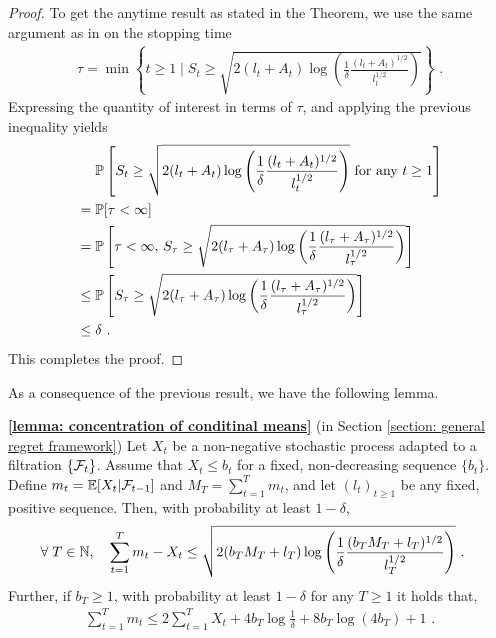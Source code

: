 \begin{proof}
	To get the anytime result as stated in the Theorem, we use the same argument as in \citep{Abbasi-YadkoriImprovedAlgorithmsLinear2011} on the stopping time
	\begin{align*}
	\tau = \min\left\{t \geq 1 \;|\; S_t \geq \sqrt{2 (l_t + A_t) \log\left(\frac{1}{\delta}\frac{(l_t + A_t)^{1/2}}{l_t^{1/2}}\right)} \right\} \text{ .}
	\end{align*}
	Expressing the quantity of interest in terms of $\tau$, and applying the previous inequality yields
	\begin{align*}
	&\+ \PP\left[ S_t \geq \sqrt{2 (l_t + A_t) \log\left(\frac{1}{\delta}\frac{(l_t + A_t)^{1/2}}{l_t^{1/2}}\right)} \text{ for any } t \geq 1\right] \\
	&=	\PP[\tau < \infty] \\
	&= \PP\left[\tau < \infty,\, S_\tau \geq \sqrt{2 (l_\tau + A_\tau) \log\left(\frac{1}{\delta}\frac{(l_\tau + A_\tau)^{1/2}}{l_\tau^{1/2}}\right)}\right] \\
	&\leq \PP\left[S_\tau \geq \sqrt{2 (l_\tau + A_\tau) \log\left(\frac{1}{\delta}\frac{(l_\tau + A_\tau)^{1/2}}{l_\tau^{1/2}}\right)} \right]\\
	&\leq \delta \text{ .}
	\end{align*}
	This completes the proof.
\end{proof}
\noindent
As a consequence of the previous result, we have the following lemma.
\begin{lemma*}{\textbf{\ref{lemma: concentration of conditinal means}}} {(in Section \ref{section: general regret framework})} 
	Let $X_t$ be a non-negative stochastic process adapted to a filtration $\{\mathcal{F}_t \}$. Assume that $X_t \leq b_t$ for a fixed, non-decreasing sequence $\{b_t\}$. Define $m_t = \mathbb{E}[X_t|\mathcal{F}_{t-1}]$ and $M_T = \sum_{t=1}^T m_t$, and let $(l_t)_{t\geq 1}$ be any fixed, positive sequence. Then, with probability at least $1-\delta$,
	\begin{align*}
	\forall \; T\in \mathbb{N}, \quad \sum_{t=1}^T m_t - X_t &\leq \sqrt{2(b_T M_T + l_T) \log\left(\frac{1}{\delta} \frac{(b_T M_T + l_T)^{1/2}}{l_T^{1/2}}\right)} \text{ .}
	\end{align*}
	Further, if $b_T \geq 1$, with probability at least $1-\delta$ for any $T \geq 1$ it holds that,
	\begin{align*}
	\sum_{t=1}^T m_t \leq 2\sum_{t=1}^T X_t + 4 b_T \log\frac{1}{\delta} + 8  b_T\log(4 b_T) + 1 \text{ .}
	\end{align*}
\end{lemma*}

